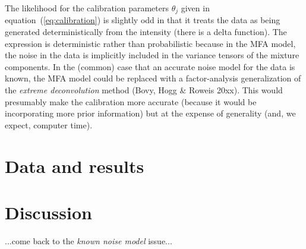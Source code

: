 \documentclass[12pt]{article}
\newcommand{\equationname}{equation}
\newcommand{\project}[1]{\textsl{#1}}
\begin{document}
The likelihood for the calibration parameters $\theta_j$ given in
\equationname~(\ref{eq:calibration}) is slightly odd in that it treats
the data as being generated deterministically from the intensity
(there is a delta function).  The expression is deterministic rather
than probabilistic because in the MFA model, the noise in the data is
implicitly included in the variance tensors of the mixture components.
In the (common) case that an accurate noise model for the data is
known, the MFA model could be replaced with a factor-analysis
generalization of the \project{extreme deconvolution} method (Bovy,
Hogg \& Roweis 20xx).  This would presumably make the calibration more
accurate (because it would be incorporating more prior information)
but at the expense of generality (and, we expect, computer time).

\section{Data and results}

\section{Discussion}

...come back to the \emph{known noise model} issue...
\end{document}

